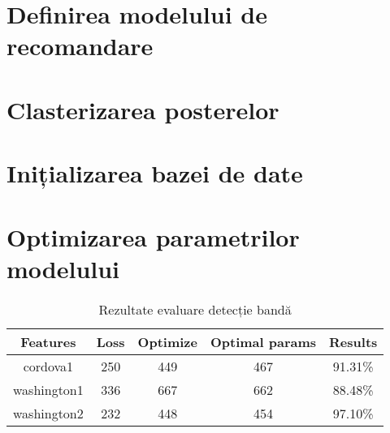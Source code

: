 \section{Definirea modelului de recomandare}

\section{Clasterizarea posterelor}

\section{Inițializarea bazei de date}

\section{Optimizarea parametrilor modelului}

\begin{table}[h!]
	\centering
	\begin{tabular}{||c | c | c | c | c ||} 
		\hline
		\textbf{Features} & \textbf{Loss} & \textbf{Optimize} & \textbf{Optimal params} & \textbf{Results} \\ [0.5ex] 
		\hline\hline
		cordova1 & 250 & 449 & 467 & 91.31\% \\ 
		washington1 & 336 & 667 & 662 & 88.48\% \\
		washington2 & 232 & 448 & 454 & 97.10\% \\ 		
		\hline
	\end{tabular}
	\caption{Rezultate evaluare detecție bandă}
	\label{table:1}
\end{table}



